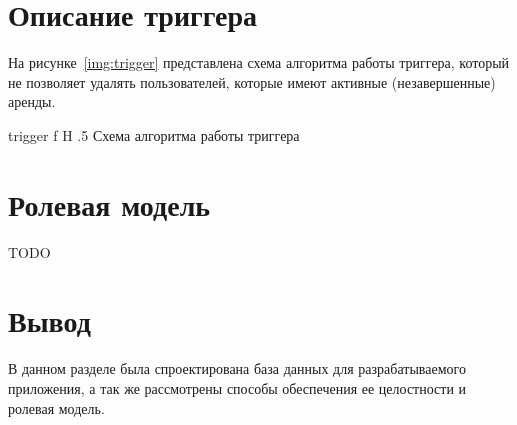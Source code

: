 \section{Описание триггера}

На рисунке~\ref{img:trigger} представлена схема алгоритма работы триггера, который не позволяет удалять пользователей, которые имеют активные (незавершенные) аренды.

    {trigger}
    {f}
    {H}
    {.5\textwidth}
    {Схема алгоритма работы триггера}

\section{Ролевая модель}

TODO

\section*{Вывод}

В данном разделе была спроектирована база данных для разрабатываемого приложения, а так же рассмотрены способы обеспечения ее целостности и ролевая модель.